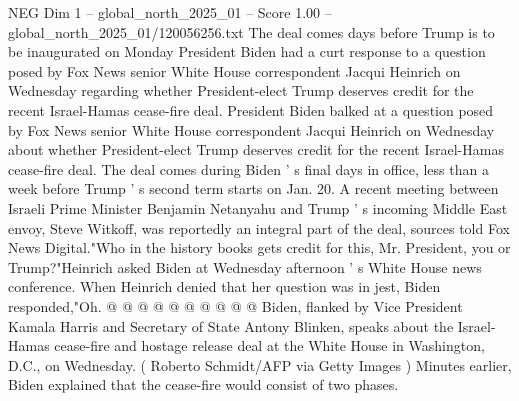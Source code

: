 \begin{textsample}{NEG Dim 1 – global\_north\_2025\_01 – Score 1.00 – global\_north\_2025\_01/120056256.txt}  \label{ex:f1_neg_087}
The deal comes days before Trump is to be inaugurated on Monday President Biden had a curt response to a question posed by Fox News senior White House correspondent Jacqui Heinrich on Wednesday regarding whether President-elect Trump deserves credit for the recent Israel-Hamas cease-fire deal.
President Biden balked at a question posed by Fox News senior White House correspondent Jacqui Heinrich on Wednesday about whether President-elect Trump deserves credit for the recent Israel-Hamas cease-fire deal.
The deal comes during Biden ' s final days in office, less than a week before Trump ' s second term starts on Jan. 20.
A recent meeting between Israeli Prime Minister Benjamin Netanyahu and Trump ' s incoming Middle East envoy, Steve Witkoff, was reportedly an integral part of the deal, sources told Fox News Digital."Who in the history books gets credit for this, Mr.
President, you or Trump?"Heinrich asked Biden at Wednesday afternoon ' s White House news conference.
When Heinrich denied that her question was in jest, Biden responded,"Oh. @ @ @ @ @ @ @ @ @ @ Biden, flanked by Vice President Kamala Harris and Secretary of State Antony Blinken, speaks about the Israel-Hamas cease-fire and hostage release deal at the White House in Washington, D.C., on Wednesday. ( Roberto Schmidt/AFP via Getty Images ) Minutes earlier, Biden explained that the cease-fire would consist of two phases.

\end{textsample}
